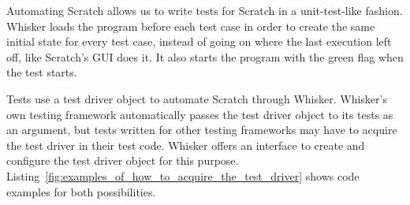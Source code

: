
Automating Scratch allows us to write tests for Scratch in a unit-test-like fashion.
Whisker loads the program before each test case in order to create the same initial state for every test case,
instead of going on where the last execution left off, like Scratch's GUI does it.
It also starts the program with the green flag when the test starts.
\parspace

Tests use a test driver object to automate Scratch through Whisker.
Whisker's own testing framework automatically passes the test driver object to its tests as an argument,
but tests written for other testing frameworks may have to acquire the test driver in their test code.
Whisker offers an interface to create and configure the test driver object for this purpose.
Listing~\ref{fig:examples_of_how_to_acquire_the_test_driver} shows code examples for both possibilities.
\parspace

